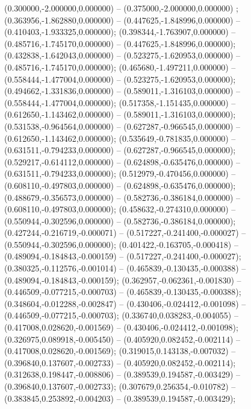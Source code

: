 (0.300000,-2.000000,0.000000) -- (0.375000,-2.000000,0.000000) ;
 (0.363956,-1.862880,0.000000) -- (0.447625,-1.848996,0.000000) -- (0.410403,-1.933325,0.000000);
 (0.398344,-1.763907,0.000000) -- (0.485716,-1.745170,0.000000) -- (0.447625,-1.848996,0.000000);
 (0.432838,-1.642043,0.000000) -- (0.523275,-1.620953,0.000000) -- (0.485716,-1.745170,0.000000);
 (0.465680,-1.497211,0.000000) -- (0.558444,-1.477004,0.000000) -- (0.523275,-1.620953,0.000000);
 (0.494662,-1.331836,0.000000) -- (0.589011,-1.316103,0.000000) -- (0.558444,-1.477004,0.000000);
 (0.517358,-1.151435,0.000000) -- (0.612650,-1.143462,0.000000) -- (0.589011,-1.316103,0.000000);
 (0.531538,-0.964564,0.000000) -- (0.627287,-0.966545,0.000000) -- (0.612650,-1.143462,0.000000);
 (0.535649,-0.781835,0.000000) -- (0.631511,-0.794233,0.000000) -- (0.627287,-0.966545,0.000000);
 (0.529217,-0.614112,0.000000) -- (0.624898,-0.635476,0.000000) -- (0.631511,-0.794233,0.000000);
 (0.512979,-0.470456,0.000000) -- (0.608110,-0.497803,0.000000) -- (0.624898,-0.635476,0.000000);
 (0.488679,-0.356573,0.000000) -- (0.582736,-0.386184,0.000000) -- (0.608110,-0.497803,0.000000);
 (0.458632,-0.274310,0.000000) -- (0.550944,-0.302596,0.000000) -- (0.582736,-0.386184,0.000000);
 (0.427244,-0.216719,-0.000071) -- (0.517227,-0.241400,-0.000027) -- (0.550944,-0.302596,0.000000);
 (0.401422,-0.163705,-0.000418) -- (0.489094,-0.184843,-0.000159) -- (0.517227,-0.241400,-0.000027);
 (0.380325,-0.112576,-0.001014) -- (0.465839,-0.130435,-0.000388) -- (0.489094,-0.184843,-0.000159);
 (0.362957,-0.062361,-0.001830) -- (0.446509,-0.077215,-0.000703) -- (0.465839,-0.130435,-0.000388);
 (0.348604,-0.012288,-0.002847) -- (0.430406,-0.024412,-0.001098) -- (0.446509,-0.077215,-0.000703);
 (0.336740,0.038283,-0.004055) -- (0.417008,0.028620,-0.001569) -- (0.430406,-0.024412,-0.001098);
 (0.326975,0.089918,-0.005450) -- (0.405920,0.082452,-0.002114) -- (0.417008,0.028620,-0.001569);
 (0.319015,0.143138,-0.007032) -- (0.396840,0.137607,-0.002733) -- (0.405920,0.082452,-0.002114);
 (0.312638,0.198447,-0.008806) -- (0.389539,0.194587,-0.003429) -- (0.396840,0.137607,-0.002733);
 (0.307679,0.256354,-0.010782) -- (0.383845,0.253892,-0.004203) -- (0.389539,0.194587,-0.003429);
